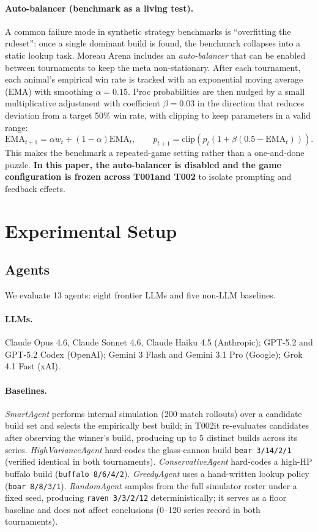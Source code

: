 \documentclass[11pt]{article}
\newcommand{\tOne}{T001}
\newcommand{\tTwo}{T002}
\begin{document}
\paragraph{Auto-balancer (benchmark as a living test).}
A common failure mode in synthetic strategy benchmarks is ``overfitting the ruleset'': once a single dominant build is found, the benchmark collapses into a static lookup task.
Moreau Arena includes an \emph{auto-balancer} that can be enabled between tournaments to keep the meta non-stationary.
After each tournament, each animal's empirical win rate is tracked with an exponential moving average (EMA) with smoothing $\alpha=0.15$.
Proc probabilities are then nudged by a small multiplicative adjustment with coefficient $\beta=0.03$ in the direction that reduces deviation from a target 50\% win rate, with clipping to keep parameters in a valid range:
\[
\mathrm{EMA}_{t+1} = \alpha w_t + (1-\alpha)\mathrm{EMA}_t,\qquad
p_{t+1} = \mathrm{clip}\!\left(p_t\left(1+\beta(0.5-\mathrm{EMA}_t)\right)\right).
\]
This makes the benchmark a repeated-game setting rather than a one-and-done puzzle.
\textbf{In this paper, the auto-balancer is disabled and the game configuration is frozen across \tOne and \tTwo} to isolate prompting and feedback effects.

\section{Experimental Setup}
\label{sec:setup}

\subsection{Agents}

We evaluate 13 agents: eight frontier LLMs and five non-LLM baselines.

\paragraph{LLMs.} Claude Opus 4.6, Claude Sonnet 4.6, Claude Haiku 4.5 (Anthropic);
GPT-5.2 and GPT-5.2 Codex (OpenAI);
Gemini 3 Flash and Gemini 3.1 Pro (Google);
Grok 4.1 Fast (xAI).

\paragraph{Baselines.}
\emph{SmartAgent} performs internal simulation (200 match rollouts) over a candidate build set and selects the empirically best build; in \tTwo it re-evaluates candidates after observing the winner's build, producing up to 5 distinct builds across its series.
\emph{HighVarianceAgent} hard-codes the glass-cannon build \texttt{bear 3/14/2/1} (verified identical in both tournaments).
\emph{ConservativeAgent} hard-codes a high-HP buffalo build (\texttt{buffalo 8/6/4/2}).
\emph{GreedyAgent} uses a hand-written lookup policy (\texttt{boar 8/8/3/1}).
\emph{RandomAgent} samples from the full simulator roster under a fixed seed, producing \texttt{raven 3/3/2/12} deterministically; it serves as a floor baseline and does not affect conclusions (0--120 series record in both tournaments).
\end{document}
